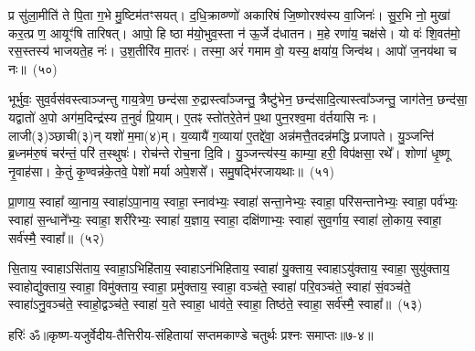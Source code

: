 प्र सु॑ला॒मीति॑ ते पि॒ता ग॒भे मु॒ष्टिम॑तꣳसयत्। द॒धि॒क्राव्ण्णो॑ अकारिषं जि॒ष्णोरश्व॑स्य वा॒जिनः॑। सु॒र॒भि नो॒ मुखा॑ कर॒त्प्र ण॒ आयूꣳ॑षि तारिषत्। आपो॒ हि ष्ठा म॑यो॒भुव॒स्ता न॑ ऊ॒र्जे द॑धातन। म॒हे रणा॑य॒ चक्ष॑से। यो वः॑ शि॒वत॑मो॒ रस॒स्तस्य॑ भाजयते॒ह नः॑। उ॒श॒तीरि॑व मा॒तरः॑। तस्मा॒ अरं॑ गमाम वो॒ यस्य॒ क्षया॑य॒ जिन्व॑थ। आपो॑ ज॒नय॑था च नः॥~(५०)\ip

{\anuvakamend[{आ॒सा॒मत्ति॒ न रो॑हतो॒ जिन्व॑थ च॒त्वारि॑ च}]}%

भूर्भुवः॒ सुव॒र्वस॑वस्त्वाञ्जन्तु गाय॒त्रेण॒ छन्द॑सा रु॒द्रास्त्वा᳚ञ्जन्तु॒ त्रैष्टु॑भेन॒ छन्द॑सादि॒त्यास्त्वा᳚ञ्जन्तु॒ जाग॑तेन॒ छन्द॑सा॒ यद्वातो॑ अ॒पो अग॑म॒दिन्द्र॑स्य त॒नुवं॑ प्रि॒याम्। ए॒तꣴ स्तो॑तरे॒तेन॑ प॒था पुन॒रश्व॒मा व॑र्तयासि नः। लाजी(३)ञ्छाची(३)न् यशो॑ म॒मा(४)म्। य॒व्यायै॑ ग॒व्याया॑ ए॒तद्दे॑वा॒ अन्न॑मत्तै॒तदन्न॑मद्धि प्रजापते। यु॒ञ्जन्ति॑ ब्र॒ध्नम॑रु॒षं चर॑न्तं॒ परि॑ त॒स्थुषः॑। रोच॑न्ते रोच॒ना दि॒वि। यु॒ञ्जन्त्य॑स्य॒ काम्या॒ हरी॒ विप॑क्षसा॒ रथे᳚। शोणा॑ धृ॒ष्णू नृ॒वाह॑सा। के॒तुं कृ॒ण्वन्न॑के॒तवे॒ पेशो॑ मर्या अपे॒शसे᳚। समु॒षद्भि॑रजायथाः॥~(५१)\ip

{\anuvakamend[{ब्र॒ध्नं पञ्च॑विꣳशतिश्च}]}%

प्रा॒णाय॒ स्वाहा᳚ व्या॒नाय॒ स्वाहा॑\-ऽपा॒नाय॒ स्वाहा॒ स्नाव॑भ्यः॒ स्वाहा॑ सन्ता॒नेभ्यः॒ स्वाहा॒ परि॑सन्तानेभ्यः॒ स्वाहा॒ पर्व॑भ्यः॒ स्वाहा॑ स॒न्धाने᳚भ्यः॒ स्वाहा॒ शरी॑रेभ्यः॒ स्वाहा॑ य॒ज्ञाय॒ स्वाहा॒ दक्षि॑णाभ्यः॒ स्वाहा॑ सुव॒र्गाय॒ स्वाहा॑ लो॒काय॒ स्वाहा॒ सर्व॑स्मै॒ स्वाहा᳚॥~(५२)\ip

{\anuvakamend[{प्रा॒णाया॒ष्टाविꣳ॑शतिः}]}%

सि॒ताय॒ स्वाहा\-ऽसि॑ताय॒ स्वाहा॒\-ऽभिहि॑ताय॒ स्वाहा\-ऽन॑भिहिताय॒ स्वाहा॑ यु॒क्ताय॒ स्वाहा\-ऽयु॑क्ताय॒ स्वाहा॒ सुयु॑क्ताय॒ स्वाहोद्यु॑क्ताय॒ स्वाहा॒ विमु॑क्ताय॒ स्वाहा॒ प्रमु॑क्ताय॒ स्वाहा॒ वञ्च॑ते॒ स्वाहा॑ परि॒वञ्च॑ते॒ स्वाहा॑ सं॒वञ्च॑ते॒ स्वाहा॑\-ऽनु॒वञ्च॑ते॒ स्वाहो॒द्वञ्च॑ते॒ स्वाहा॑ य॒ते स्वाहा॒ धाव॑ते॒ स्वाहा॒ तिष्ठ॑ते॒ स्वाहा॒ सर्व॑स्मै॒ स्वाहा᳚॥~(५३)\ip

{\anuvakamend[{सि॒ताया॒ष्टात्रिꣳ॑शत्}]}%

{हरिः॑ ॐ}{॥कृष्ण-यजुर्वेदीय-तैत्तिरीय-संहितायां सप्तमकाण्डे चतुर्थः प्रश्नः समाप्तः॥७-४॥}


